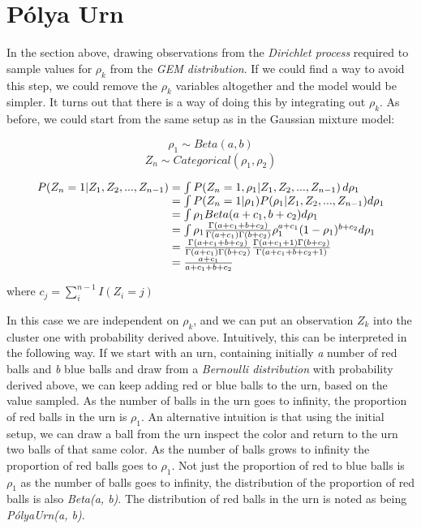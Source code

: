 \documentclass[12pt,a4paper]{article}
\begin{document}
\section{Pólya Urn}

In the section above, drawing observations from the \textit{Dirichlet process} required to sample values for $\rho_{k}$ from the \textit{GEM distribution}. If we could find a way to avoid this step, we could remove the $\rho_{k}$ variables altogether and the model would be simpler. It turns out that there is a way of doing this by integrating out $\rho_{k}$. As before, we could start from the same setup as in the Gaussian mixture model:

$$\rho_{1} \sim Beta(a, b)$$
$$Z_{n} \sim Categorical(\rho_{1}, \rho_{2})$$

\begin{align*}
\begin{array}{l@{{}={}}l}
    P(Z_{n} = 1|Z_{1}, Z_{2}, ..., Z_{n-1})
    & \int P(Z_{n} = 1, \rho_{1}|Z_{1}, Z_{2}, ..., Z_{n-1}) \,d\rho_{1} \\
    & \int P(Z_{n} = 1|\rho_{1})P(\rho_{1}|Z_{1}, Z_{2}, ..., Z_{n-1}) d\rho_{1} \\
    & \int \rho_{1} Beta(a + c_{1}, b + c_{2})d\rho_{1} \\
    & \int \rho_{1} \frac{\Gamma(a + c_{1} + b + c_{2})}{\Gamma(a+c_{1})\Gamma(b+c_{2})}\rho_{1}^{a+c_{1}}(1-\rho_{1})^{b+c_{2}} d\rho_{1} \\
    & \frac{\Gamma(a + c_{1} + b + c_{2})}{\Gamma(a+c_{1})\Gamma(b+c_{2})} \frac{\Gamma(a+c_{1}+1)\Gamma(b+c_{2})}{\Gamma(a + c_{1} + b + c_{2}+1)} \\
    & \frac{a + c_{1}}{a + c_{1} + b + c_{2}}
\end{array}
\end{align*}

where $c_{j} = \sum_{i}^{n-1}I(Z_{i} = j)$

In this case we are independent on $\rho_{k}$, and we can put an observation $Z_{k}$ into the cluster one with probability derived above. Intuitively, this can be interpreted in the following way. If we start with an urn, containing initially \textit{a} number of red balls and \textit{b} blue balls and draw from a \textit{Bernoulli distribution} with probability derived above, we can keep adding red or blue balls to the urn, based on the value sampled. As the number of balls in the urn goes to infinity, the proportion of red balls in the urn is $\rho_{1}$. An alternative intuition is that using the initial setup, we can draw a ball from the urn inspect the color and return to the urn two balls of that same color. As the number of balls grows to infinity the proportion of red balls goes to $\rho_{1}$. Not just the proportion of red to blue balls is $\rho_{1}$ as the number of balls goes to infinity, the distribution of the proportion of red balls is also \textit{Beta(a, b)}. The distribution of red balls in the urn is noted as being \textit{PólyaUrn(a, b)}.
\end{document}

